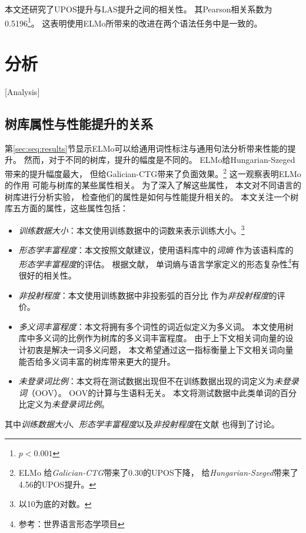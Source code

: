 本文还研究了UPOS提升与LAS提升之间的相关性。
其Pearson相关系数为0.5196\footnote{$p<0.001$}。
这表明使用ELMo所带来的改进在两个语法任务中是一致的。

\section{分析}[Analysis]
\subsection{树库属性与性能提升的关系}
第\ref{sec:seq:results}节显示ELMo可以给通用词性标注与通用句法分析带来性能的提升。
然而，对于不同的树库，提升的幅度是不同的。
ELMo给Hungarian-Szeged带来的提升幅度最大，
但给Galician-CTG带来了负面效果。\footnote{ELMo
	给\textit{Galician-CTG}带来了0.30的UPOS下降，
	给\textit{Hungarian-Szeged}带来了4.56的UPOS提升。}
这一观察表明ELMo的作用
可能与树库的某些属性相关。
为了深入了解这些属性，
本文对不同语言的树库进行分析实验，
检查他们的属性是如何与性能提升相关的。
本文关注一个树库五方面的属性，这些属性包括：
\begin{itemize}
\item \textit{训练数据大小}：本文使用训练数据中的词数来表示训练大小。\footnote {以10为底的对数。}
\item \textit{形态学丰富程度}：本文按照文献建议，使用语料库中的\textit{词熵}
作为该语料库的\textit{形态学丰富程度}的评估。
根据文献，
单词熵与语言学家定义的形态复杂性\footnote{参考：世界语言形态学项目}有很好的相关性。
\item \textit{非投射程度}：本文使用训练数据中非投影弧的百分比
作为\textit{非投射程度}的评价。
\item \textit{多义词丰富程度}：本文将拥有多个词性的词近似定义为多义词。
本文使用树库中多义词的比例作为树库的多义词丰富程度。
由于上下文相关词向量的设计初衷是解决一词多义问题，
本文希望通过这一指标衡量上下文相关词向量能否给多义词丰富的树库带来更大的提升。
\item \textit{未登录词比例}：本文将在测试数据出现但不在训练数据出现的词定义为\textit{未登录词}（OOV）。
OOV的计算与生语料无关。
本文将测试数据中此类单词的百分比定义为\textit{未登录词比例}。
\end{itemize}
其中\textit{训练数据大小}、\textit{形态学丰富程度}以及\textit{非投射程度}在文献
也得到了讨论。

